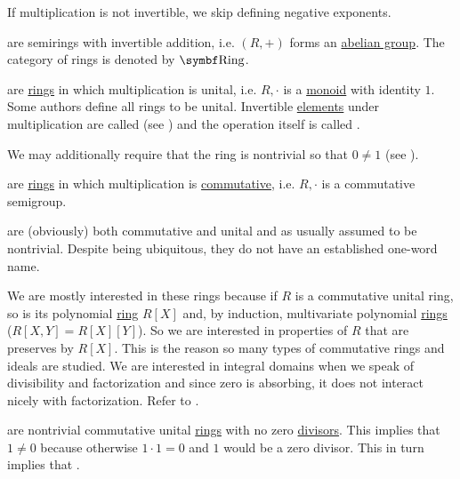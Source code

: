 \begin{definition}
\begin{DefEnum}[resume=def:semiring]
    If multiplication is not invertible, we skip defining negative exponents.

      are semirings with invertible addition, i.e. \( (R, +) \) forms an \hyperref[def:abelian_group]{abelian group}. The category of rings is denoted by \( \Cat{Ring} \).

      are \hyperref[def:semiring/ring]{rings} in which multiplication is unital, i.e. \( R, \cdot \) is a \hyperref[def:magma/monoid]{monoid} with identity \( 1 \). Some authors define all rings to be unital. Invertible \hyperref[def:algebraic_theory/invertibile_element]{elements} under multiplication are called  (see ) and the operation itself is called .

    We may additionally require that the ring is nontrivial so that \( 0 \neq 1 \) (see ).

      are \hyperref[def:semiring/ring]{rings} in which multiplication is \hyperref[def:algebraic_theory/commutativity]{commutative}, i.e. \( R, \cdot \) is a commutative semigroup.

      are (obviously) both commutative and unital and as usually assumed to be nontrivial. Despite being ubiquitous, they do not have an established one-word name.

    We are mostly interested in these rings because if \( R \) is a commutative unital ring, so is its polynomial \hyperref[def:algebra_of_polynomials]{ring} \( R[X] \) and, by induction\IND, multivariate polynomial \hyperref[def:multivariate_polynomial]{rings} (\( R[X, Y] = R[X][Y] \)). So we are interested in properties of \( R \) that are preserves by \( R[X] \). This is the reason so many types of commutative rings and ideals are studied. We are interested in integral domains when we speak of divisibility and factorization and since zero is absorbing, it does not interact nicely with factorization. Refer to .

      are nontrivial commutative unital \hyperref[def:semiring/commutative_unital_ring]{rings} with no zero \hyperref[def:commutative_ring_division]{divisors}. This implies that \( 1 \neq 0 \) because otherwise \( 1 \cdot 1 = 0 \) and \( 1 \) would be a zero divisor. This in turn implies that .


\end{DefEnum}
\end{definition}
